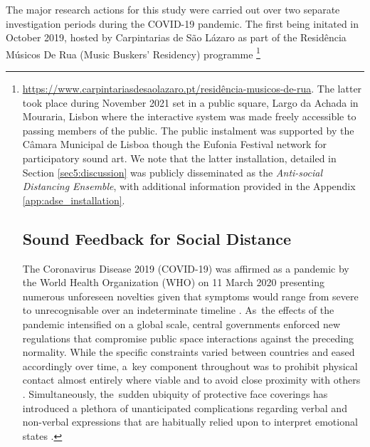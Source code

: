 The major research actions for this study were carried out over two separate investigation periods during the COVID-19 pandemic. The first being initated in October 2019, hosted by Carpintarias de São Lázaro as part of the Residência Músicos De Rua (Music Buskers' Residency) programme \footnote{\url{https://www.carpintariasdesaolazaro.pt/residência-musicos-de-rua}. The latter took place during November 2021 set in a public square, Largo da Achada in Mouraria, Lisbon where the interactive system was made freely accessible to passing members of the public. The public instalment was supported by the Câmara Municipal de Lisboa though the Eufonia Festival network for participatory sound art. We note that the latter installation, detailed in Section \ref{sec5:discussion} was publicly disseminated as the \textit{Anti-social Distancing Ensemble}, with additional information provided in the Appendix \ref{app:adse_installation}.

\section[Sound Feedback for Social Distance]{Sound Feedback for Social Distance}
\label{case_studies:adse_ess_introduction}

The Coronavirus Disease 2019 (COVID-19) was affirmed as a pandemic by the World Health Organization (WHO) on 11 March 2020 \citep{cucinotta_who_2020} presenting numerous unforeseen novelties given that symptoms would range from severe to unrecognisable over an indeterminate timeline \citep{woelfel_clinical_2020}. As~the effects of the pandemic intensified on a global scale, central governments enforced new regulations that compromise public space interactions against the preceding normality. While the specific constraints varied between countries and eased accordingly over time, a~key component throughout was to prohibit physical contact almost entirely where viable and to avoid close proximity with others \citep{toquero_challenges_2020, uk_department_of_health_and_social_care_coronavirus_2020}. Simultaneously, the~sudden ubiquity of protective face coverings has introduced a plethora of unanticipated complications regarding verbal and non-verbal expressions that are habitually relied upon to interpret emotional states \citep{marta_i_2021,carbon_wearing_2020,grundmann_face_2020}.

}
